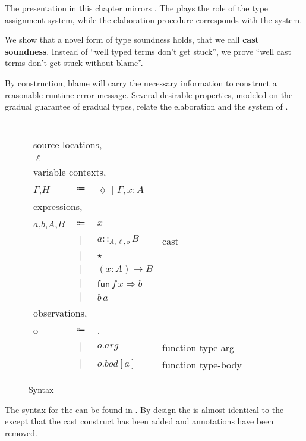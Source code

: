 The presentation in this chapter mirrors .
The \csys{} plays the role of the type assignment system, while the elaboration procedure corresponds with the \bidir{} system.
 
We show that a novel form of type soundness holds, that we call \textbf{cast soundness}.
Instead of ``well typed terms don't get stuck'', we prove ``well cast terms don't get stuck without blame''.
 
By construction, blame will carry the necessary information to construct a reasonable runtime error message.
Several desirable properties, modeled on the gradual guarantee of gradual types, relate the \csys{} elaboration and the \bidir{} system of .

\section{\CLang{}}
 
\begin{figure}
\begin{tabular}{lcll}
\multicolumn{4}{l}{source locations,}\tabularnewline
$\ensuremath{\ell}$ &  &  & \tabularnewline
\multicolumn{4}{l}{variable contexts,}\tabularnewline
$\Gamma$,$H$ & $\Coloneqq$ & $\lozenge$ $|$ $\Gamma,x:A$ & \tabularnewline
\multicolumn{4}{l}{expressions,}\tabularnewline
$a$,$b$,$A$,$B$ & $\Coloneqq$ & $x$ & \tabularnewline
& $|$ & $a::_{A,\ensuremath{\ell},o}B$ & cast\tabularnewline
& $|$ & $\star$ & \tabularnewline
& $|$ & $\left(x:A\right)\rightarrow B$ & \tabularnewline
& $|$ & $\mathsf{fun}\,f\,x\Rightarrow b$ & \tabularnewline
& $|$ & $b\,a$ & \tabularnewline
\multicolumn{4}{l}{observations,}\tabularnewline
o & $\Coloneqq$ & . & \tabularnewline
& $|$ & $o.arg$ & function type-arg\tabularnewline
& $|$ & $o.bod[a]$ & function type-body\tabularnewline
\end{tabular}


\caption{\CLang{} Syntax}
\label{fig:cast-pre-syntax}
\end{figure}

The syntax for the \clang{} can be found in .
By design the \clang{} is almost identical to the \slang{} except that the cast construct has been added and annotations have been removed.

